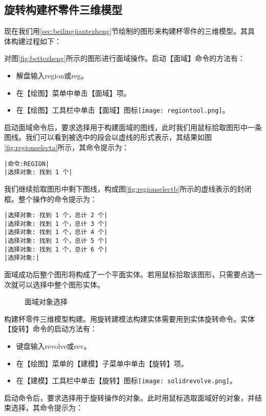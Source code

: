 \subsection{旋转构建杯零件三维模型}
现在我们用\ref{sec:beilingjiantezheng}节绘制的图形来构建杯零件的三维模型。其具体构建过程如下：
\begin{procedure}
\item 对图\ref{fig:bettezheng}所示的图形进行面域操作。启动【面域】命令的方法有：
\begin{itemize}
\item 解盘输入region或reg。
\item 在【绘图】菜单中单击【面域】项。
\item 在【绘图】工具栏中单击【面域】图标\texttt{[image: regiontool.png]}。
\end{itemize}
启动面域命令后，要求选择用于构建面域的图线，此时我们用鼠标拾取图形中一条图线。我们可以看到被选中的段会以虚线的形式表示，其结果如图\ref{fig:regionselecta}所示，其命令提示为：
\begin{lstlisting}
|命令:REGION|
|选择对象: 找到 1 个|
\end{lstlisting}
我们继续拾取图形中剩下图线，构成图\ref{fig:regionselectb}所示的虚线表示的封闭框。整个操作的命令提示为：
\begin{lstlisting}
|选择对象: 找到 1 个，总计 2 个|
|选择对象: 找到 1 个，总计 3 个|
|选择对象: 找到 1 个，总计 4 个|
|选择对象: 找到 1 个，总计 5 个|
|选择对象: 找到 1 个，总计 6 个|
|选择对象:|
\end{lstlisting}
面域成功后整个图形将构成了一个平面实体。若用鼠标拾取该图形，只需要点选一次就可以选择中整个图形实体。
\begin{figure}[htbp]
\centering
{}\hspace{30pt}
\caption{面域对象选择}
\end{figure}
\item 构建杯零件三维模型构建。用旋转建模法构建实体需要用到实体旋转命令。实体【旋转】命令的启动方法有：
\begin{itemize}
\item 键盘输入revolve或rev。
\item 在【绘图】菜单的【建模】子菜单中单击【旋转】项。
\item 在【建模】工具栏中单击【旋转】图标\texttt{[image: solidrevolve.png]}。
\end{itemize}
启动命令后，要求选择用于旋转操作的对象。此时用鼠标选取面域好的对象，并结束选择，其命令提示为：

\end{procedure}
